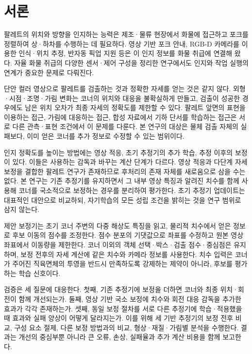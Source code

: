 \section{서론}\label{sec:introduction}
팔레트의 위치와 방향을 인지하는 능력은 제조·물류 현장에서 화물에 접근하고 포크를 정렬하여 상·하차를 수행하는 데 필요하다. 영상 기반 포크 안내\cite{seelinger2006}, RGB-D 카메라를 이용한 인식·위치 추정\cite{xiao2017}, 반자동 픽업 지원\cite{molter2019} 등은 이 인지 정보를 화물 취급에 연결해 왔다. 자율 화물 취급의 다양한 센서·제어 구성을 정리한 연구\cite{kohne2026}에서도 인지와 작업 실행의 연계가 중요한 문제로 다뤄진다.

단안 컬러 영상으로 팔레트를 검출하는 것과 정확한 자세를 얻는 것은 같지 않다. 외형·시점·조명·가림 변화는 코너의 위치와 대응을 불확실하게 만들고, 검출이 성공한 경우에도 남은 위치 오차가 최종 자세의 정확도를 제한할 수 있다. 팔레트 앞면의 표현을 이용하는 접근\cite{kai2025}, 가림에 대응하는 접근\cite{vu2024}, 합성 자료에서 기하 단서를 학습하는 접근\cite{beleznai2025}은 서로 다른 관측·표현 조건에서 이 문제를 다룬다. 본 연구의 대상은 물체 검출 자체의 실패보다, 이미 얻은 코너를 추가 정보로 수정할 수 있는 범위이다.

인지 정확도를 높이는 방법에는 영상 적응, 초기 추정기의 추가 학습, 추정 이후의 보정이 있다. 이들은 사용하는 감독과 바꾸는 계산 단계가 다르다. 영상 적응과 다단계 자세 보정을 결합한 팔레트 연구\cite{elmoaqet2025}가 존재하므로 후처리의 존재 자체를 새로움으로 삼을 수는 없다. 본 연구는 기존 추정기를 유지하면서 그 내부 영상 특징과 알려진 치수를 함께 사용해 코너를 국소적으로 보정하는 경우를 분리하여 평가한다. 초기 추정기 업데이트는 대표적인 대안으로 비교하되, 자기학습의 모든 성립 조건을 밝히는 것을 연구 범위로 삼지 않는다.

제안 보정기는 초기 코너 주변의 다중 해상도 특징을 읽고, 물리적 치수에서 얻은 정보로 후보 이동의 점수를 조정한다. 점수 분포의 기댓값으로 좌표를 수정하고 원본 영상 좌표에서 이동량을 제한한다. 코너 이외의 객체 선택·박스·검출 점수·중심점은 유지하며, 보정 전후의 자세 계산에 같은 치수와 카메라 정보를 사용한다. 치수 입력은 코너가 주어진 직육면체의 투영을 반드시 만족하도록 강제하는 제약이 아니라, 후보를 평가하는 학습 신호이다.

검증은 세 질문에 대응한다. 첫째, 기존 추정기에 보정을 더하면 코너와 최종 위치·회전이 함께 개선되는가. 둘째, 영상 기반 국소 보정에 치수와 회전 대응 감독을 추가한 효과가 각각 존재하는가. 셋째, 동일 보정 절차를 서로 다른 추정기에 학습·적용했을 때 효과와 실패 양상이 어떻게 달라지는가. 이를 위해 세 기반 추정기의 보정 전후 비교, 구성 요소 절제, 다른 보정 방법과의 비교, 형상·재질·가림별 분석을 수행한다. 결과는 개선의 중심부뿐 아니라 큰 오류, 손상, 실패율과 추가 계산 비용을 함께 보고한다.
